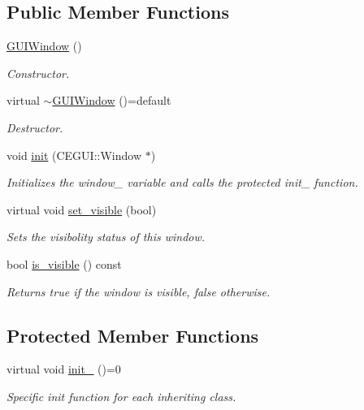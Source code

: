 \subsection*{Public Member Functions}
\begin{DoxyCompactItemize}
\item 
\hyperlink{class_g_u_i_window_a1d5f55e836dbe199acf6c6226d3793ec}{G\+U\+I\+Window} ()
\begin{DoxyCompactList}\small\item\em Constructor. \end{DoxyCompactList}\item 
virtual \hyperlink{class_g_u_i_window_a128001b8c20994f3b6b19271d11e5ec7}{$\sim$\+G\+U\+I\+Window} ()=default
\begin{DoxyCompactList}\small\item\em Destructor. \end{DoxyCompactList}\item 
void \hyperlink{class_g_u_i_window_ab5853dcaebef10aae4d625f5a0e7510d}{init} (C\+E\+G\+U\+I\+::\+Window $\ast$)
\begin{DoxyCompactList}\small\item\em Initializes the window\+\_\+ variable and calls the protected init\+\_\+ function. \end{DoxyCompactList}\item 
virtual void \hyperlink{class_g_u_i_window_afaa290bb3bb0020e676bb546d942e528}{set\+\_\+visible} (bool)
\begin{DoxyCompactList}\small\item\em Sets the visibolity status of this window. \end{DoxyCompactList}\item 
bool \hyperlink{class_g_u_i_window_af1d24e2d77fe3755db729059110d7a6c}{is\+\_\+visible} () const 
\begin{DoxyCompactList}\small\item\em Returns true if the window is visible, false otherwise. \end{DoxyCompactList}\end{DoxyCompactItemize}
\subsection*{Protected Member Functions}
\begin{DoxyCompactItemize}
\item 
virtual void \hyperlink{class_g_u_i_window_a2a7c011363f401a57a26cc7c7652bdfd}{init\+\_\+} ()=0
\begin{DoxyCompactList}\small\item\em Specific init function for each inheriting class. \end{DoxyCompactList}\end{DoxyCompactItemize}
